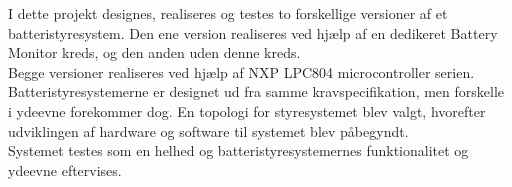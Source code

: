 I dette projekt designes, realiseres og testes to forskellige versioner af et batteristyresystem. Den ene version realiseres ved hjælp af en dedikeret Battery Monitor kreds, og den anden uden denne kreds.
\\

Begge versioner realiseres ved hjælp af NXP LPC804 microcontroller serien. Batteristyresystemerne er designet ud fra samme kravspecifikation, men forskelle i ydeevne forekommer dog. En topologi for styresystemet blev valgt, hvorefter udviklingen af hardware og software til systemet blev påbegyndt.
\\

Systemet testes som en helhed og batteristyresystemernes funktionalitet og ydeevne eftervises.